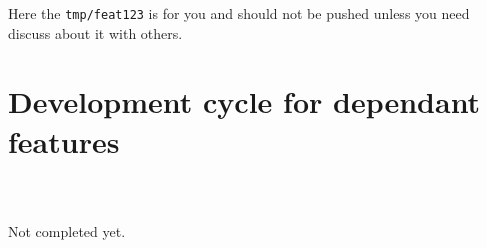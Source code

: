 Here the \texttt{tmp/feat123} is for you and should not be pushed unless you need discuss about it with others.

\section{Development cycle for dependant features}

\begin{lstlisting}
\end{lstlisting}

\begin{lstlisting}
\end{lstlisting}

\begin{lstlisting}
\end{lstlisting}

Not completed yet.
